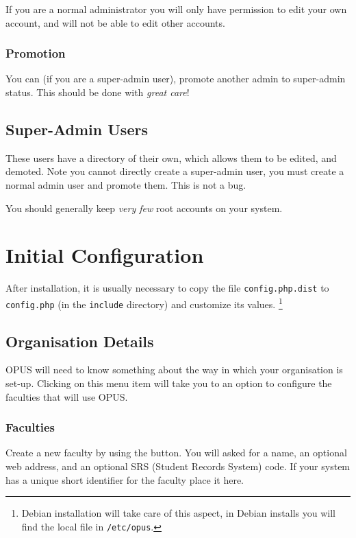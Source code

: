 \documentclass[12 pt]{book}
\begin{document}
If you are a normal administrator you will only have permission to edit your own
account, and will not be able to edit other accounts.


\subsection{Promotion}

You can (if you are a super-admin user), promote another admin to super-admin
status. This should be done with \emph{great care}!

\section{Super-Admin Users}

These users have a directory of their own, which allows them to be edited,
and demoted. Note you cannot directly create a super-admin user, you must 
create a normal admin user and promote them. This is not a bug.

You should generally keep \emph{very few} root accounts on your system.




\chapter{Initial Configuration}

After installation, it is usually necessary to copy the file
\lstinline!config.php.dist! to \lstinline!config.php! (in the 
\lstinline!include! directory) and customize its values.
\footnote{Debian installation will take care of this aspect, in Debian installs
you will find the local file in \lstinline!/etc/opus!.}

\section{Organisation Details}

OPUS will need to know something about the way in which your organisation is
set-up. Clicking on this menu item will take you to an option to configure the
faculties that will use OPUS.

\subsection{Faculties}

Create a new faculty by using the 
button. You will asked for a name, an optional web address, and an optional SRS
(Student Records System) code. If your system has a unique short identifier for
the faculty place it here.
\end{document}
